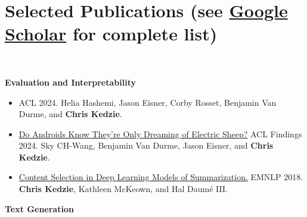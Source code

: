 \documentclass[letterpaper,11pt]{article}
\begin{document}
\clearpage

\section{Selected Publications (see \href{https://scholar.google.com/citations?hl=en&user=-xcIYgsAAAAJ}{Google Scholar} for complete list)}
\newcommand{\nlgcolor}{Maroon}
\newcommand{\evalcolor}{Green}
\newcommand{\mtcolor}{Blue}
\newcommand{\extsumcolor}{RoyalPurple}
\newcommand{\socialnlpcolor}{magenta}
\newcommand{\PubEntry}[5]{\noindent\hangindent=0em\hangafter=0 #3\\ {\textit{#4.}} #1. \\ ~\\} 
\newcommand{\PubEntryInline}[5]{\noindent\hangindent=0em\hangafter=0 \href{#2}{\color{#5}{#3}} {\textit{#4.}} #1.} 
\newcommand{\PubEntryAward}[6]{\noindent\hangindent=0em\hangafter=0 \href{#2}{\color{#5}{#3}} {\textit{#4 -- {#6}.}} #1. \\ ~\\} 
\newcommand{\MarginSection}[1]{\marginpar{#1}} 

~\\
\small 

\textbf{Evaluation and Interpretability}\\

\begin{itemize}[leftmargin=6.0mm]
\item {\color{Maroon}{LLM-Rubric: A Multidimensional, Calibrated~Approach~to~Automated~Evaluation of Natural Language Texts.}} ACL 2024.
Helia Hashemi, Jason Eisner, Corby Rosset, Benjamin Van Durme, and \textbf{Chris Kedzie}.\\


\item \href{https://arxiv.org/pdf/2312.17249v2}{Do Androids Know They're Only Dreaming of Electric Sheep?} ACL Findings 2024.
Sky CH-Wang, Benjamin Van Durme, Jason Eisner, and \textbf{Chris Kedzie}.\\


\item \href{https://www.aclweb.org/anthology/D18-1208v2.pdf}{Content Selection in Deep Learning Models of Summarization.} EMNLP 2018.
\textbf{Chris Kedzie}, Kathleen McKeown, and Hal Daum\'e III.
\end{itemize}

\textbf{Text Generation}\\
\end{document}
